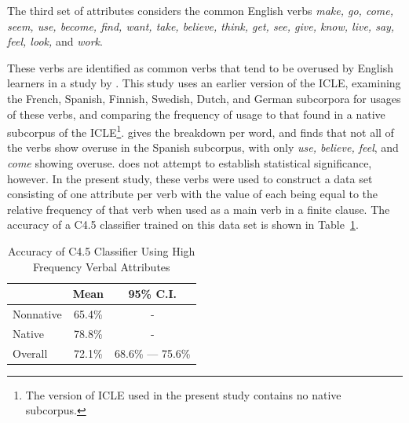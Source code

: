 \documentclass[main.tex]{subfiles}
\begin{document}
The third set of attributes considers the common English verbs \textit{make, go, come, seem, use, become, find, want, take, believe, think, get, see, give, know, live, say, feel, look,} and \textit{work}.

These verbs are identified as common verbs that tend to be overused by English learners in a study by \citet{ringbom:1998}. This study uses an earlier version of the ICLE, examining the French, Spanish, Finnish, Swedish, Dutch, and German subcorpora for usages of these verbs, and comparing the frequency of usage to that found in a native subcorpus of the ICLE\footnote{The version of ICLE used in the present study contains no native subcorpus.}. \citeauthor{ringbom:1998} gives the breakdown per word, and finds that not all of the verbs show overuse in the Spanish subcorpus, with only \textit{use, believe, feel}, and \textit{come} showing overuse. \citeauthor{ringbom:1998} does not attempt to establish statistical significance, however. In the present study, these verbs were used to construct a data set consisting of one attribute per verb with the value of each being equal to the relative frequency of that verb when used as a main verb in a finite clause. The accuracy of a C4.5 classifier trained on this data set is shown in Table~\ref{table:high-freq-results}.
\begin{table}[htbp]
\centering
\caption{Accuracy of C4.5 Classifier Using High Frequency Verbal Attributes}
\begin{tabular}{l c c}
\toprule
& Mean & 95\% C.I.\\
\midrule
Nonnative & 65.4\% & - \\
[6pt]Native & 78.8\% & - \\
[6pt]Overall & 72.1\% & 68.6\% --- 75.6\% \\
\bottomrule
\end{tabular}
\label{table:high-freq-results}
\end{table}
\end{document}
